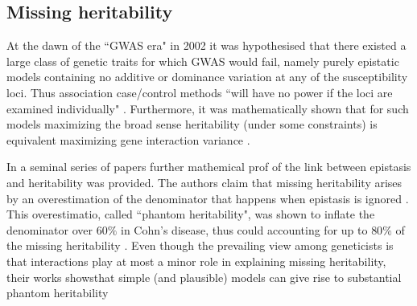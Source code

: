 
\subsection{Missing heritability}

At the dawn of the ``GWAS era" in 2002 it was hypothesised that there existed a large class of genetic traits for which GWAS would fail, namely purely epistatic models containing no additive or dominance variation at any of the susceptibility loci. 
Thus association case/control methods ``will have no power if the loci are examined individually" \cite{culverhouse2002perspective}.
Furthermore, it was mathematically shown that for such models maximizing the broad sense heritability (under some constraints) is equivalent maximizing gene interaction variance \cite{culverhouse2002perspective}.

In a seminal series of papers \cite{zuk2012mystery, zuk2014searching} further mathemical prof of the link between epistasis and heritability was provided.
The authors claim that missing heritability arises by an overestimation of the denominator that happens when epistasis is ignored \cite{zuk2012mystery}.
This overestimatio, called ``phantom heritability", was shown to inflate the denominator over $60\%$ in Cohn's disease, thus could accounting for up to $80\%$ of the missing heritability \cite{zuk2012mystery}.
Even though the prevailing view among geneticists is that interactions play at most a minor role in explaining missing heritability, their works showsthat simple (and plausible) models can give rise to substantial phantom heritability \cite{zuk2012mystery}

